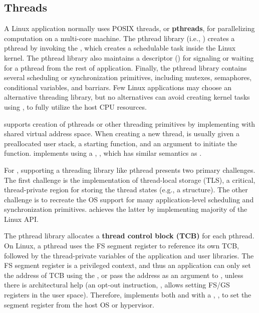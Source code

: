 \subsection{Threads}
\label{sec:libos:thread}


A Linux application normally uses POSIX threads, or {\bf pthreads},
for parallelizing computation on a multi-core machine.
The pthread library (i.e., \libpthread{}) creates a pthread
by invoking the  \linuxapi{},
which creates a schedulable task inside the Linux kernel.
The pthread library also maintains a descriptor () for signaling or waiting for a pthread from the rest of application.
Finally,
the pthread library contains several scheduling or synchronization primitives,
including mutexes, semaphores, conditional variables,
and barriars.
Few Linux applications may choose an alternative threading library, but no alternatives can avoid creating kernel tasks using ,
to fully utilize the host CPU resources.



\thelibos{} supports creation of pthreads
or other threading primitives
by implementing  with shared virtual address space. %
When creating a new thread, 
 is usually given a preallocated user stack, a starting function, and an argument to initiate the function.
\thelibos{} implements  using a \hostapi{}, , which has similar semantics as .


For \thelibos{}, supporting a threading library like pthread
presents two primary challenges.
The first challenge is the implementation
of thread-local storage (TLS), a critical, thread-private region for storing the thread states (e.g., a  structure).
The other challenge is to recreate the OS support
for many application-level scheduling and synchronization primitives.
\thelibos{} achieves the latter by implementing majority of the Linux  API.



The pthread library allocates a {\bf thread control block (TCB)} for each pthread.
On \graphenearch{} Linux, a pthread %
uses the FS segment register
to reference its own TCB,
followed by the thread-private variables of the application
and user libraries. 
The FS segment register is a privileged context,
and thus an application can only set the address of TCB using the  \linuxapi{}, or pass the address as an argument to ,
unless there is architectural help (an opt-out \graphenearch{} instruction, , allows setting FS/GS registers in the user space).
Therefore, \thelibos{} implements both 
and  with a \hostapi{}, , to set the segment register from the host OS or hypervisor.


